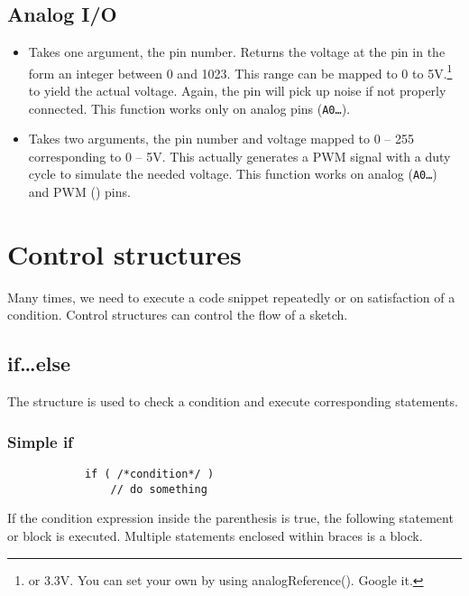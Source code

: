 \documentclass{article}
\begin{document}
	\subsection{Analog I/O}

		\begin{itemize}

			\item {} Takes one argument, the pin number. Returns the voltage at the pin in the form an integer between 0 and 1023. This range can be mapped to 0 to 5V.\footnote{or 3.3V. You can set your own by using analogReference(). Google it.} to yield the actual voltage. Again, the pin will pick up noise if not properly connected. This function works only on analog pins (\texttt{A0\ldots}).

			\item {} Takes two arguments, the pin number and voltage mapped to 0 -- 255 corresponding to 0 -- 5V. This actually generates a PWM signal with a duty cycle to simulate the needed voltage. This function works on analog (\texttt{A0\ldots}) and PWM (\texttt{\raisebox{0.5ex}{\texttildelow}}) pins.

		\end{itemize}

\section{Control structures}

	Many times, we need to execute a code snippet repeatedly or on satisfaction of a condition. Control structures can control the flow of a sketch. 

	\subsection{if\ldots else}

		The  structure is used to check a condition and execute corresponding statements.

		\subsubsection{Simple if}

			\begin{lstlisting}
			if ( /*condition*/ )
				// do something
			\end{lstlisting}

			If the condition expression inside the parenthesis is true, the following statement or block is executed. Multiple statements enclosed within braces is a block.
\end{document}
